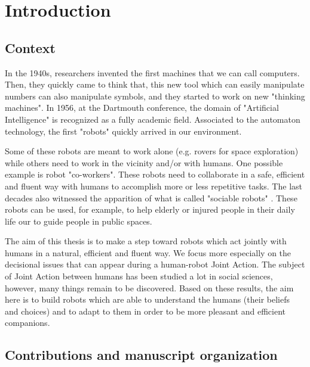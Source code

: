 \documentclass[english,a4paper,11pt,twoside]{StyleThese}
\begin{document}
\dominitoc
\faketableofcontents
\fi


\chapter*{Introduction}
\minitoc

\section*{Context}

In the 1940s, researchers invented the first machines that we can call computers. Then, they quickly came to think that, this new tool which can easily manipulate numbers can also manipulate symbols, and they started to work on new "thinking machines". In 1956, at the Dartmouth conference, the domain of "Artificial Intelligence" is recognized as a fully academic field. Associated to the automaton technology, the first "robots" quickly arrived in our environment.

Some of these robots are meant to work alone (e.g. rovers for space exploration) while others need to work in the vicinity and/or with humans. One possible example is robot "co-workers". These robots need to collaborate in a safe, efficient and fluent way with humans to accomplish more or less repetitive tasks. The last decades also witnessed the apparition of what is called "sociable robots" \cite{dautenhahn2007socially}. These robots can be used, for example, to help elderly or injured people in their daily life our to guide people in public spaces. 

The aim of this thesis is to make a step toward robots which act jointly with humans in a natural, efficient and fluent way. We focus more especially on the decisional issues that can appear during a human-robot Joint Action. The subject of Joint Action between humans has been studied a lot in social sciences, however, many things remain to be discovered. Based on these results, the aim here is to build robots which are able to understand the humans (their beliefs and choices) and to adapt to them in order to be more pleasant and efficient companions.

\section*{Contributions and manuscript organization}
\end{document}

